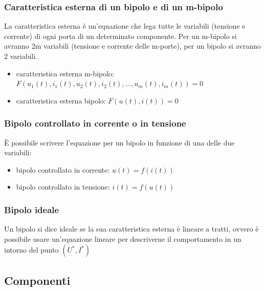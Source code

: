\documentclass[a4paper]{article}
\begin{document}
\subsubsection*{Caratteristica esterna di un bipolo e di un m-bipolo}
La caratteristica esterna è un'equazione che lega tutte le variabili (tensione e corrente) di ogni porta di un determinato
componente. Per un m-bipolo si avranno 2m variabili (tensione e corrente delle m-porte), per un bipolo si avranno 2 variabili.
\begin{itemize}
	\item caratteristica esterna m-bipolo: \(F(u_1(t), i_1(t), u_2(t), i_2(t),\dots, u_m(t), i_m(t)) = 0\)
	\item caratteristica esterna bipolo: \(F(u(t), i(t)) = 0\)
\end{itemize}

\subsubsection*{Bipolo controllato in corrente o in tensione}
È possibile scrivere l'equazione per un bipolo in funzione di una delle due variabili:
\begin{itemize}
	\item bipolo controllato in corrente: \(u(t) = f(i(t))\)
	\item bipolo controllato in tensione: \(i(t) = f(u(t))\)
\end{itemize}

\subsubsection*{Bipolo ideale}
Un bipolo si dice ideale se la sua caratteristica esterna è lineare a tratti, ovvero è possibile usare un'equazione lineare per
descriverne il comportamento in un intorno del punto \((U^*, I^*)\)

\subsection{Componenti}
\end{document}

